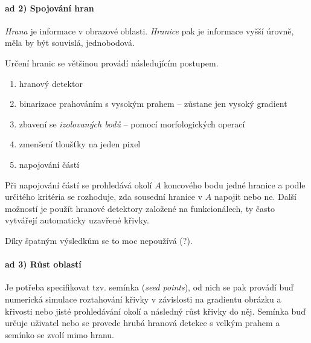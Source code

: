 
\paragraph{ad 2) Spojování hran}

\emph{Hrana} je informace v obrazové oblasti. \emph{Hranice} pak je informace vyšší úrovně, měla by být souvislá, 
jednobodová.

Určení hranic se většinou provádí následujícím postupem.

\begin{enumerate}
	\item hranový detektor
	\item binarizace prahováním s vysokým prahem -- zůstane jen vysoký gradient
	\item zbavení se \emph{izolovaných bodů} -- pomocí morfologických operací
	\item zmenšení tloušťky na jeden pixel
	\item napojování částí
\end{enumerate}

Při napojování částí se prohledává okolí $A$ koncového bodu jedné hranice a podle určitého kritéria se rozhoduje, zda sousední hranice v $A$ napojit nebo ne. Další možností je použít hranové detektory založené na funkcionálech, ty často vytvářejí automaticky uzavřené křivky.

Díky špatným výsledkům se to moc nepoužívá (?).


\paragraph{ad 3) Růst oblastí}
Je potřeba specifikovat tzv. semínka (\emph{seed points}), od nich se pak provádí buď numerická simulace roztahování
křivky v závislosti na gradientu obrázku a křivosti nebo jisté prohledávání okolí a následný růst křivky do něj.
Semínka buď určuje uživatel nebo se provede hrubá hranová detekce s velkým prahem a semínko se zvolí mimo hranu.

